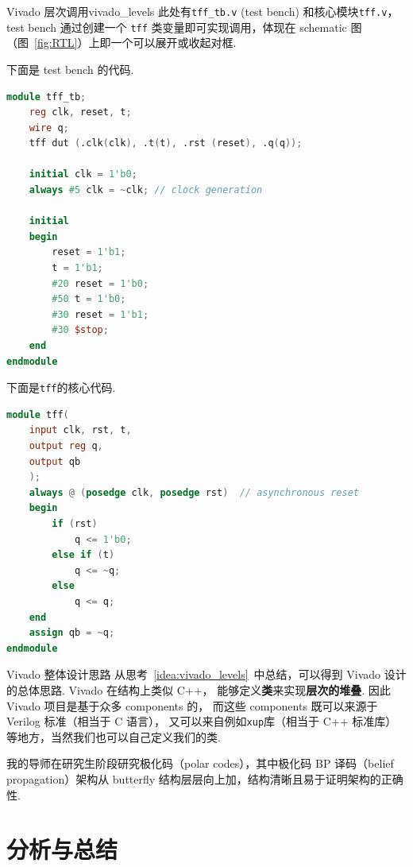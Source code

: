 \documentclass[11pt]{SEU-Digital-Report}
\begin{document}
            \begin{idea}{Vivado 层次调用}{vivado_levels}
                此处有\texttt{tff\_tb.v} (test bench) 和核心模块\texttt{tff.v}，test bench 通过创建一个 \texttt{tff} 类变量即可实现调用，体现在 schematic 图（图~\ref{fig:RTL}）上即一个可以展开或收起对框.

                下面是 test bench 的代码.
                \begin{lstlisting}[numbers=none,language=verilog,title=tff\_tb.v,backgroundcolor=\color{blue!3},morekeywords={tff}]
module tff_tb;
    reg clk, reset, t;
    wire q;
    tff dut (.clk(clk), .t(t), .rst (reset), .q(q));
    
    initial clk = 1'b0;
    always #5 clk = ~clk; // clock generation
    
    initial
    begin
        reset = 1'b1;
        t = 1'b1;
        #20 reset = 1'b0; 
        #50 t = 1'b0;
        #30 reset = 1'b1;
        #30 $stop;
    end
endmodule
                \end{lstlisting}
                下面是\texttt{tff}的核心代码.
                \begin{lstlisting}[numbers=none,language=verilog,title=tff.v,backgroundcolor=\color{blue!3}]
module tff(
    input clk, rst, t,
    output reg q, 
    output qb
    );
    always @ (posedge clk, posedge rst)  // asynchronous reset
    begin
        if (rst)
            q <= 1'b0;
        else if (t)
            q <= ~q;
        else 
            q <= q;
    end  
    assign qb = ~q;
endmodule
            \end{lstlisting}
            \end{idea}

            \begin{idea}{Vivado 整体设计思路}{}
                从思考~\ref{idea:vivado_levels}~中总结，可以得到 Vivado 设计的总体思路.
                Vivado 在结构上类似 C++，
                能够定义\textbf{类}来实现\textbf{层次的堆叠}.
                因此 Vivado 项目是基于众多 components 的，
                而这些 components 既可以来源于 Verilog 标准（相当于 C 语言），
                又可以来自例如\texttt{xup}库（相当于 C++ 标准库）等地方，当然我们也可以自己定义我们的类.

                我的导师在研究生阶段研究极化码（polar codes），其中极化码 BP 译码（belief propagation）架构从 butterfly 结构层层向上加，结构清晰且易于证明架构的正确性.
            \end{idea}

    \section{分析与总结}
\end{document}
